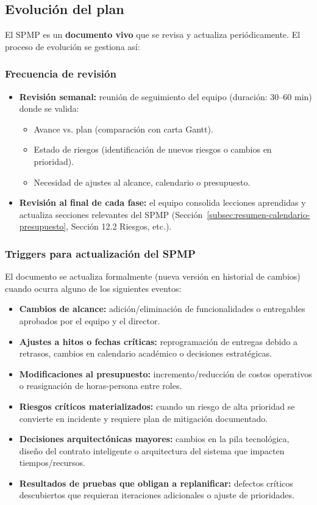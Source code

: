 \documentclass[12pt,oneside]{report}
\begin{document}
    \subsection{Evolución del plan}
    \label{subsec:evolucion-plan}
    El SPMP es un \textbf{documento vivo} que se revisa y actualiza periódicamente. El proceso de evolución se gestiona así:
    
    \subsubsection*{Frecuencia de revisión}
    \begin{itemize}
      \item \textbf{Revisión semanal:} reunión de seguimiento del equipo (duración: 30--60 min) donde se valida:
      \begin{itemize}
        \item Avance vs. plan (comparación con carta Gantt).
        \item Estado de riesgos (identificación de nuevos riesgos o cambios en prioridad).
        \item Necesidad de ajustes al alcance, calendario o presupuesto.
      \end{itemize}
      \item \textbf{Revisión al final de cada fase:} el equipo consolida lecciones aprendidas y actualiza secciones relevantes del SPMP (Sección~\ref{subsec:resumen-calendario-presupuesto}, Sección 12.2 Riesgos, etc.).
    \end{itemize}

    \subsubsection*{Triggers para actualización del SPMP}
    El documento se actualiza formalmente (nueva versión en historial de cambios) cuando ocurra alguno de los siguientes eventos:
    \begin{itemize}
      \item \textbf{Cambios de alcance:} adición/eliminación de funcionalidades o entregables aprobados por el equipo y el director.
      \item \textbf{Ajustes a hitos o fechas críticas:} reprogramación de entregas debido a retrasos, cambios en calendario académico o decisiones estratégicas.
      \item \textbf{Modificaciones al presupuesto:} incremento/reducción de costos operativos o reasignación de horas-persona entre roles.
      \item \textbf{Riesgos críticos materializados:} cuando un riesgo de alta prioridad se convierte en incidente y requiere plan de mitigación documentado.
      \item \textbf{Decisiones arquitectónicas mayores:} cambios en la pila tecnológica, diseño del contrato inteligente o arquitectura del sistema que impacten tiempos/recursos.
      \item \textbf{Resultados de pruebas que obligan a replanificar:} defectos críticos descubiertos que requieran iteraciones adicionales o ajuste de prioridades.
    \end{itemize}
\end{document}
